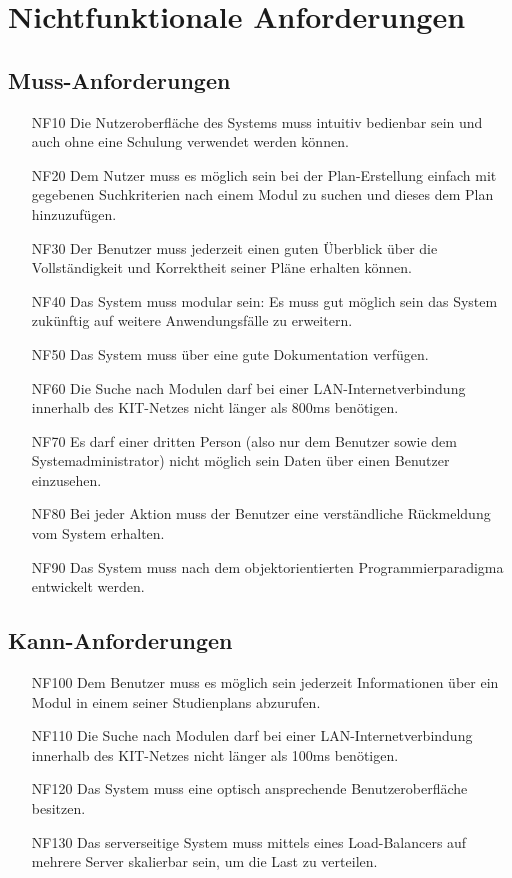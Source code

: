 \section{Nichtfunktionale Anforderungen}
\subsection{Muss-Anforderungen}
\begin{itemize}[nosep]
	\item[NF10]
		Die Nutzeroberfläche des Systems muss intuitiv bedienbar sein und auch ohne eine Schulung verwendet werden können.
	\item[NF20]
		Dem Nutzer muss es möglich sein bei der Plan-Erstellung einfach mit gegebenen Suchkriterien nach einem \gls{Modul} zu suchen und dieses dem Plan hinzuzufügen.
	\item[NF30]
		Der \gls{Benutzer} muss jederzeit einen guten Überblick über die Vollständigkeit und Korrektheit seiner Pläne erhalten können.
	\item[NF40]
		Das System muss modular sein: Es muss gut möglich sein das System zukünftig auf weitere Anwendungsfälle zu erweitern.
	\item[NF50]
		Das System muss über eine gute Dokumentation verfügen.
	\item[NF60]
		Die Suche nach Modulen darf bei einer LAN-Internetverbindung innerhalb des KIT-Netzes nicht länger als 800ms benötigen.
	\item[NF70]
		Es darf einer dritten Person (also nur dem \gls{Benutzer} sowie dem Systemadministrator) nicht möglich sein Daten über einen \gls{Benutzer} einzusehen.
	\item[NF80]
		Bei jeder Aktion muss der \gls{Benutzer} eine verständliche Rückmeldung vom System erhalten.
	\item[NF90]
		Das System muss nach dem objektorientierten Programmierparadigma entwickelt werden.
\end{itemize}
\subsection{Kann-Anforderungen}
\label{subsec:nonfunc_requirements-kann}
\begin{itemize}[nosep]
	\item[NF100]
		Dem \gls{Benutzer} muss es möglich sein jederzeit Informationen über ein Modul in einem seiner \glspl{Studienplan} abzurufen.
	\item[NF110]
		Die Suche nach Modulen darf bei einer LAN-Internetverbindung innerhalb des KIT-Netzes nicht länger als 100ms benötigen.
	\item[NF120]
		Das System muss eine optisch ansprechende Benutzeroberfläche besitzen.
	\item[NF130]
		Das serverseitige System muss mittels eines Load-Balancers auf mehrere Server skalierbar sein, um die Last zu verteilen.
\end{itemize}

